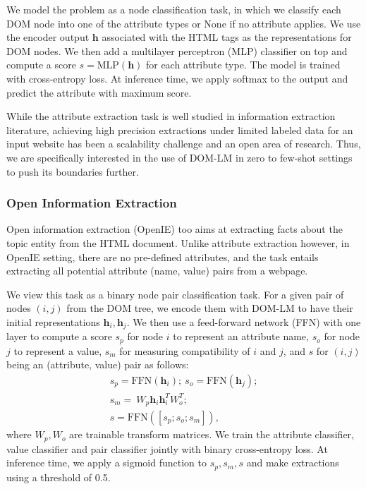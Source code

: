 \documentclass[sigconf, nonacm]{acmart}
\newcommand{\ours}[0]{DOM-LM}
\begin{document}
We model the problem as a node classification task, in which we classify each DOM node into one of the attribute types or None if no attribute applies. 
We use the encoder output $\mathbf{h}$ associated with the HTML tags as the representations for DOM nodes. We then add a multilayer perceptron (MLP) classifier on top and compute a score $s=\text{MLP}(\mathbf{h})$ for each attribute type. The model is trained with cross-entropy loss. At inference time, we apply softmax to the output and predict the attribute with maximum score. 

While the attribute extraction task is well studied in information extraction literature, achieving high precision extractions under limited labeled data for an input website has been a scalability challenge and an open area of research. Thus, we are specifically interested in the use of \ours{} in zero to few-shot settings to push its boundaries further.

\subsubsection{Open Information Extraction}
Open information extraction (OpenIE) too aims at extracting facts about the topic entity from the HTML document. Unlike attribute extraction however, in OpenIE setting, there are no pre-defined attributes, and the task entails extracting all potential attribute (name, value) pairs from a webpage. 

We view this task as a binary node pair classification task. For a given pair of nodes $(i, j)$ from the DOM tree, we encode them with \ours{} to have their initial representations $\mathbf{h}_i, \mathbf{h}_j$. We then use a feed-forward network (FFN) with one layer to compute a score $s_p$ for node $i$ to represent an attribute name, $s_o$ for node $j$ to represent a value, $s_m$ for measuring compatibility of $i$ and $j$, and $s$ for $(i, j)$ being an (attribute, value) pair as follows:
\begin{gather}
s_p = \text{FFN}(\mathbf{h}_i);\ s_o = \text{FFN}(\mathbf{h}_j);\\
s_m =\ W_p\mathbf{h}_i\mathbf{h}_i^{T}W_o^T;\\
s = \text{FFN}([s_p;s_o;s_m]),
\end{gather}
where $W_p, W_o$ are trainable transform matrices. We train the attribute classifier, value classifier and pair classifier jointly with binary cross-entropy loss. At inference time, we apply a sigmoid function to $s_p, s_m, s$ and make extractions using a threshold of 0.5.
\end{document}
